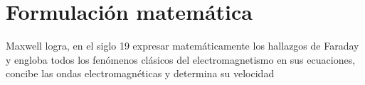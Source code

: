 %
%
%
%
%
%

\section{Formulación matemática}

Maxwell logra, en el siglo 19 expresar matemáticamente los hallazgos de Faraday y engloba todos los fenómenos clásicos del electromagnetismo en sus ecuaciones, concibe las ondas electromagnéticas y determina su velocidad


